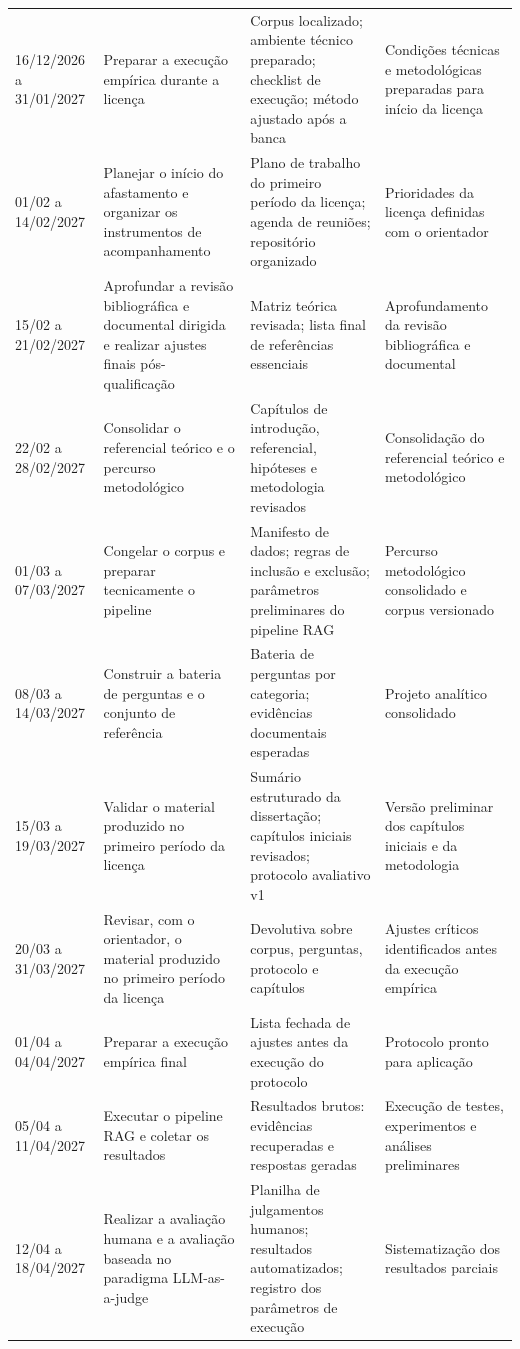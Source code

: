 \documentclass[11pt,a4paper]{article}
\begin{document}
\begin{longtable}{P{3.2cm}P{7.5cm}P{8.0cm}P{7.5cm}}
16/12/2026 a 31/01/2027 & Preparar a execução empírica durante a licença & Corpus localizado; ambiente técnico preparado; checklist de execução; método ajustado após a banca & Condições técnicas e metodológicas preparadas para início da licença \\
01/02 a 14/02/2027 & Planejar o início do afastamento e organizar os instrumentos de acompanhamento & Plano de trabalho do primeiro período da licença; agenda de reuniões; repositório organizado & Prioridades da licença definidas com o orientador \\
15/02 a 21/02/2027 & Aprofundar a revisão bibliográfica e documental dirigida e realizar ajustes finais pós-qualificação & Matriz teórica revisada; lista final de referências essenciais & Aprofundamento da revisão bibliográfica e documental \\
22/02 a 28/02/2027 & Consolidar o referencial teórico e o percurso metodológico & Capítulos de introdução, referencial, hipóteses e metodologia revisados & Consolidação do referencial teórico e metodológico \\
01/03 a 07/03/2027 & Congelar o corpus e preparar tecnicamente o pipeline & Manifesto de dados; regras de inclusão e exclusão; parâmetros preliminares do pipeline RAG & Percurso metodológico consolidado e corpus versionado \\
08/03 a 14/03/2027 & Construir a bateria de perguntas e o conjunto de referência & Bateria de perguntas por categoria; evidências documentais esperadas & Projeto analítico consolidado \\
15/03 a 19/03/2027 & Validar o material produzido no primeiro período da licença & Sumário estruturado da dissertação; capítulos iniciais revisados; protocolo avaliativo v1 & Versão preliminar dos capítulos iniciais e da metodologia \\
20/03 a 31/03/2027 & Revisar, com o orientador, o material produzido no primeiro período da licença & Devolutiva sobre corpus, perguntas, protocolo e capítulos & Ajustes críticos identificados antes da execução empírica \\
01/04 a 04/04/2027 & Preparar a execução empírica final & Lista fechada de ajustes antes da execução do protocolo & Protocolo pronto para aplicação \\
05/04 a 11/04/2027 & Executar o pipeline RAG e coletar os resultados & Resultados brutos: evidências recuperadas e respostas geradas & Execução de testes, experimentos e análises preliminares \\
12/04 a 18/04/2027 & Realizar a avaliação humana e a avaliação baseada no paradigma LLM-as-a-judge & Planilha de julgamentos humanos; resultados automatizados; registro dos parâmetros de execução & Sistematização dos resultados parciais \\

\end{longtable}
\end{document}
